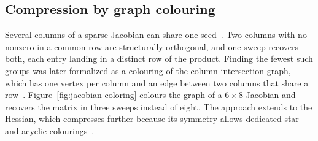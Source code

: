 \subsection{Compression by graph colouring}\label{sec:graph-colouring}
Several columns of a sparse Jacobian can share one seed~\cite{curtis1974estimation}. Two
columns with no nonzero in a common row are structurally orthogonal, and one sweep
recovers both, each entry landing in a distinct row of the product. Finding the fewest
such groups was later formalized as a colouring of the column intersection graph, which
has one vertex per column and an edge between two columns that share a
row~\cite{coleman1983estimation, gebremedhin2005color}.
Figure~\ref{fig:jacobian-coloring} colours the graph of a $6 \times 8$ Jacobian and
recovers the matrix in three sweeps instead of eight. The approach extends to the Hessian,
which compresses further because its symmetry allows dedicated star and acyclic
colourings~\cite{powell1979estimation, Gebremedhin2009SparseHessians}.


